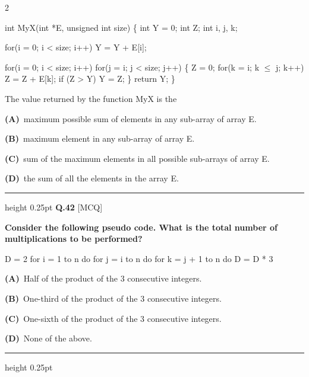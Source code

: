 \documentclass[a4paper,10pt,twoside]{article}
\begin{document}
\begin{multicols}{2}
{int MyX(int *E, unsigned int size)
\{
int Y = 0;
int Z;
int i, j, k;
\par\smallskip
for(i = 0; i < size; i++)
Y = Y + E[i];
\par\smallskip
for(i = 0; i < size; i++)
for(j = i; j < size; j++)
\{
Z = 0;
for(k = i; k $\le$ j; k++)
Z = Z + E[k];
if (Z > Y)
Y = Z;
\}
return Y;
\}
\par\smallskip
The value returned by the function MyX is the \par}
\par\vspace{2pt}\noindent
\textbf{(A)}~maximum possible sum of elements in any sub-array of array E.\par\vspace{2pt}\noindent
\textbf{(B)}~maximum element in any sub-array of array E.\par\vspace{2pt}\noindent
\textbf{(C)}~sum of the maximum elements in all possible sub-arrays of array E.\par\vspace{2pt}\noindent
\textbf{(D)}~the sum of all the elements in the array E.
\par\vspace{6pt}\hrule height 0.25pt\vspace{6pt}
\noindent\textbf{Q.42} \hfill {\footnotesize\textsf{[MCQ]}}
\par\vspace{2pt}
{\bfseries Consider the following pseudo code. What is the total number of multiplications to be performed?
\par\smallskip
D = 2
for i = 1 to n do
for j = i to n do
for k = j + 1 to n do
D = D * 3 \par}
\par\vspace{2pt}\noindent
\textbf{(A)}~Half of the product of the 3 consecutive integers.\par\vspace{2pt}\noindent
\textbf{(B)}~One-third of the product of the 3 consecutive integers.\par\vspace{2pt}\noindent
\textbf{(C)}~One-sixth of the product of the 3 consecutive integers.\par\vspace{2pt}\noindent
\textbf{(D)}~None of the above.
\par\vspace{6pt}\hrule height 0.25pt\vspace{6pt}

\end{multicols}
\end{document}
